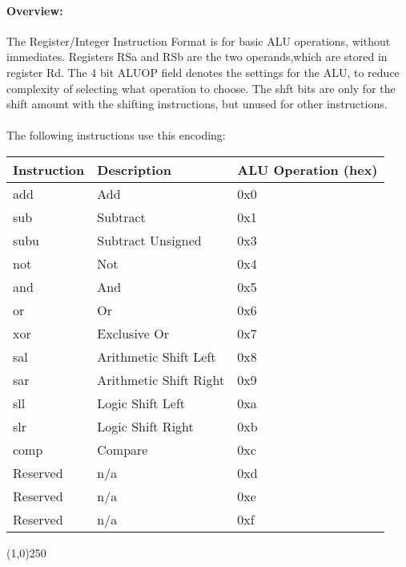 \documentclass[letterpaper, 11pt]{article}
\begin{document}
\paragraph{Overview:}The Register/Integer Instruction Format is for basic ALU operations, without immediates. Registers RSa and RSb are the two operands,which
are stored in register Rd. The 4 bit ALUOP field denotes the settings for the ALU, to reduce complexity of selecting what operation to choose.
The shft bits are only for the shift amount with the shifting instructions, but unused for other instructions. 
\paragraph{}The following instructions use this encoding:\\
\begin{center}
	\begin{longtable}{|l|l|l|}\hline
			Instruction & Description 				& ALU Operation (hex) \\ \hline
			add			& Add 						& 0x0 \\ \hline
			sub 		& Subtract					& 0x1 \\ \hline
			subu		& Subtract Unsigned 		& 0x3 \\ \hline
			not		& Not			& 0x4 \\ \hline
			and			& And						& 0x5 \\ \hline
			or			& Or						& 0x6 \\ \hline
			xor			& Exclusive Or				& 0x7 \\ \hline
			sal			& Arithmetic Shift Left		& 0x8 \\ \hline
			sar			& Arithmetic Shift Right	& 0x9 \\ \hline
			sll			& Logic Shift Left			& 0xa \\ \hline
			slr			& Logic Shift Right			& 0xb \\ \hline
			comp		& Compare					& 0xc \\ \hline
			Reserved	& n/a						& 0xd \\ \hline
			Reserved	& n/a						& 0xe \\ \hline
			Reserved	& n/a						& 0xf \\ \hline

\end{longtable}
\end{center}
\begin{center}
	\line(1,0){250}
\end{center}
\end{document}
